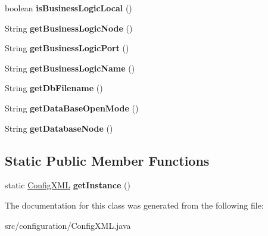 \begin{DoxyCompactItemize}
boolean {\bfseries is\+Business\+Logic\+Local} ()
\item 
\mbox{\label{classconfiguration_1_1_config_x_m_l_a6a79b28dd9e0c1c755fef0e7435ec03a}} 
String {\bfseries get\+Business\+Logic\+Node} ()
\item 
\mbox{\label{classconfiguration_1_1_config_x_m_l_a7e8cb431bc1e899176ae2891c007f7f3}} 
String {\bfseries get\+Business\+Logic\+Port} ()
\item 
\mbox{\label{classconfiguration_1_1_config_x_m_l_ad6866b6aee38c74c082135f5dcd743ad}} 
String {\bfseries get\+Business\+Logic\+Name} ()
\item 
\mbox{\label{classconfiguration_1_1_config_x_m_l_a403cc4242d937a87dfea24caabaf535d}} 
String {\bfseries get\+Db\+Filename} ()
\item 
\mbox{\label{classconfiguration_1_1_config_x_m_l_a693787d7818204c9188cb0c03d9423a0}} 
String {\bfseries get\+Data\+Base\+Open\+Mode} ()
\item 
\mbox{\label{classconfiguration_1_1_config_x_m_l_a622fdcb9a55b406b6bc2fa63509dae72}} 
String {\bfseries get\+Database\+Node} ()
\end{DoxyCompactItemize}
\subsection*{Static Public Member Functions}
\begin{DoxyCompactItemize}
\item 
\mbox{\label{classconfiguration_1_1_config_x_m_l_a74c5e0c09c0139554ede8d786cb808ff}} 
static \mbox{\hyperlink{classconfiguration_1_1_config_x_m_l}{Config\+X\+ML}} {\bfseries get\+Instance} ()
\end{DoxyCompactItemize}


The documentation for this class was generated from the following file\+:\begin{DoxyCompactItemize}
\item 
src/configuration/Config\+X\+M\+L.\+java\end{DoxyCompactItemize}
